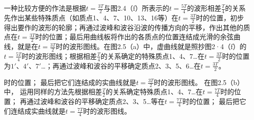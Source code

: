 一种比较方便的作法是根据\(t=\frac{3T}{2}\)与图2.4（f）所表示的\(t=\frac{5T}{4}\)的波形相差\(\frac{T}{4}\)的关系先作出某些特殊质点（如质点1、4、7、10、13、16等）在\(t=\frac{3T}{2}\)时的位置，初步得出要作的波形的轮廓；再通过波峰和波谷沿波的传播方向的平移，作出其他的质点在\(t=\frac{3T}{2}\)时的位置；最后用曲线板将作出的各质点的位置连结成光滑的余弦曲线，就是在\(t=\frac{3T}{2}\)时的波形图线。在图2.5（a）中，虚曲线就是照抄图2·4（f）的\(t=\frac{5T}{4}\)时的波形图线；根据相差\(\frac{T}{4}\)的关系确定的特殊质点1、4、7\ldots 在\(t=\frac{3T}{2}\)时的位置为\(1'\)、\(4'\)、\(7'\)\ldots；再通过波峰和波谷的平移确定质点2、3、5、6\ldots 在\(t=\frac{3T}{2}\)。

时的位置；
最后把它们连结成的实曲线就是\(t = \frac{3T}{2}\)时的波形图线。
在图2.5（b）中，
运用同样的方法先根据相差\(\frac{T}{2}\)的关系确定特殊质点1、4、7\ldots 在\(t = \frac{7T}{4}\)时的位置；
再通过波峰和波谷的平移确定质点2、3、5\ldots 等在\(t = \frac{7T}{4}\)时的位置；
最后把它们连结成实曲线就是\(t = \frac{7T}{4}\)时的波形图线。

